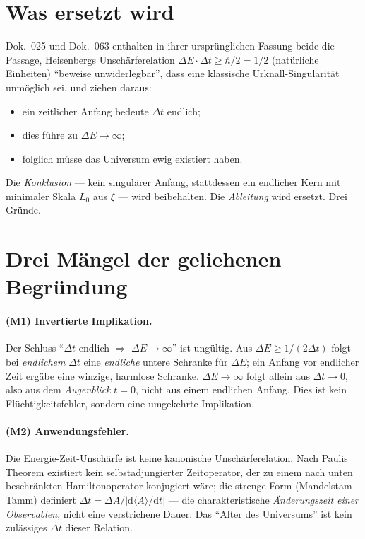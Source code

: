 \medskip

\section{Was ersetzt wird}

Dok.~025 und Dok.~063 enthalten in ihrer ursprünglichen Fassung beide die Passage, Heisenbergs Unschärferelation
$\Delta E\cdot\Delta t \ge \hbar/2 = 1/2$ (natürliche Einheiten) \enquote{beweise unwiderlegbar},
dass eine klassische Urknall-Singularität unmöglich sei, und ziehen daraus:
\begin{itemize}
\item ein zeitlicher Anfang bedeute $\Delta t$ endlich;
\item dies führe zu $\Delta E \to \infty$;
\item folglich müsse das Universum ewig existiert haben.
\end{itemize}
Die \emph{Konklusion} --- kein singulärer Anfang, stattdessen ein endlicher Kern mit minimaler
Skala $L_0$ aus $\xi$ --- wird beibehalten. Die \emph{Ableitung} wird ersetzt. Drei Gründe.

\section{Drei Mängel der geliehenen Begründung}

\paragraph{(M1) Invertierte Implikation.} Der Schluss \enquote{$\Delta t$ endlich $\Rightarrow$
$\Delta E \to \infty$} ist ungültig. Aus $\Delta E \ge 1/(2\Delta t)$ folgt bei \emph{endlichem}
$\Delta t$ eine \emph{endliche} untere Schranke für $\Delta E$; ein Anfang vor endlicher Zeit
ergäbe eine winzige, harmlose Schranke. $\Delta E \to \infty$ folgt allein aus $\Delta t \to 0$,
also aus dem \emph{Augenblick} $t=0$, nicht aus einem endlichen Anfang. Dies ist kein
Flüchtigkeitsfehler, sondern eine umgekehrte Implikation.

\paragraph{(M2) Anwendungsfehler.} Die Energie-Zeit-Unschärfe ist keine kanonische
Unschärferelation. Nach Paulis Theorem existiert kein selbstadjungierter Zeitoperator, der zu
einem nach unten beschränkten Hamiltonoperator konjugiert wäre; die strenge Form
(Mandelstam--Tamm) definiert $\Delta t = \Delta A / |\mathrm{d}\langle A\rangle/\mathrm{d}t|$ ---
die charakteristische \emph{Änderungszeit einer Observablen}, nicht eine verstrichene Dauer. Das
\enquote{Alter des Universums} ist kein zulässiges $\Delta t$ dieser Relation.

